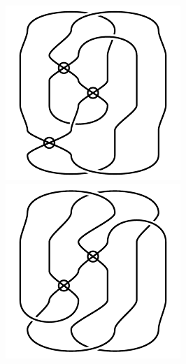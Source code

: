 \begin{figure}[H]
\begin{minipage}[b]{.18\linewidth}
\end{minipage}
\begin{minipage}[b]{.18\linewidth}
\centering
\includegraphics[width=\linewidth]{../data/virtual_4_64.png}
\end{minipage}
\begin{minipage}[b]{.18\linewidth}
\centering
\includegraphics[width=\linewidth]{../data/virtual_4_65.png}

\end{minipage}
\end{figure}

